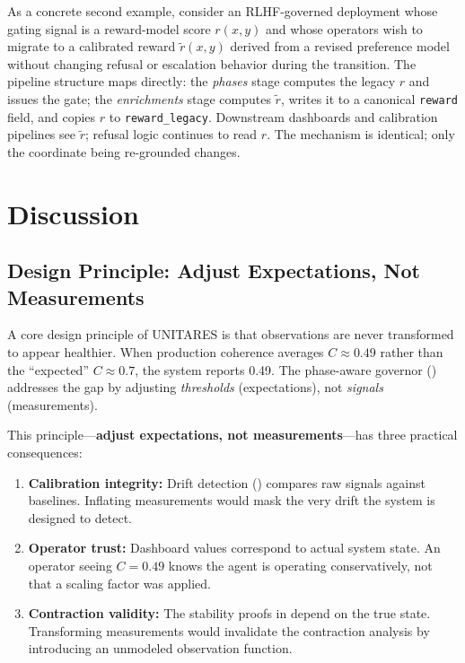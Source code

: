 \documentclass[11pt,twocolumn]{article}
\begin{document}
As a concrete second example, consider an RLHF-governed deployment
whose gating signal is a reward-model score $r(x, y)$ and whose
operators wish to migrate to a calibrated reward $\tilde{r}(x, y)$
derived from a revised preference model without changing refusal or
escalation behavior during the transition. The pipeline structure
maps directly: the \emph{phases} stage computes the legacy $r$ and
issues the gate; the \emph{enrichments} stage computes $\tilde{r}$,
writes it to a canonical \texttt{reward} field, and copies $r$ to
\texttt{reward\_legacy}. Downstream dashboards and calibration
pipelines see $\tilde{r}$; refusal logic continues to read $r$.
The mechanism is identical; only the coordinate being re-grounded
changes.


\section{Discussion}
\label{sec:discussion}

\subsection{Design Principle: Adjust Expectations, Not Measurements}
\label{sec:honest}

A core design principle of UNITARES is that observations are never
transformed to appear healthier. When production coherence averages
$C \approx 0.49$ rather than the ``expected'' $C \approx 0.7$, the
system reports 0.49. The phase-aware governor ()
addresses the gap by adjusting \emph{thresholds} (expectations), not
\emph{signals} (measurements).

This principle---\textbf{adjust expectations, not measurements}---has
three practical consequences:
\begin{enumerate}
\item \textbf{Calibration integrity:} Drift detection
  () compares raw signals against baselines.
  Inflating measurements would mask the very drift the system is
  designed to detect.
\item \textbf{Operator trust:} Dashboard values correspond to actual
  system state. An operator seeing $C = 0.49$ knows the agent is
  operating conservatively, not that a scaling factor was applied.
\item \textbf{Contraction validity:} The stability proofs in
   depend on the true state. Transforming
  measurements would invalidate the contraction analysis by
  introducing an unmodeled observation function.
\end{enumerate}
\end{document}
